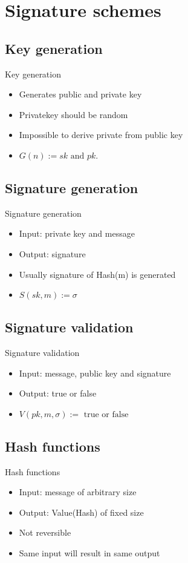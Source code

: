 \documentclass{beamer}
\begin{document}
\section{Signature schemes}
\subsection{Key generation}
\begin{frame}{Key generation}
	\begin{itemize}
	\item Generates public and private key
	\item Privatekey should be random
	\item Impossible to derive private from public key
	\item $G(n) := sk \text{ and } pk.$
	\end{itemize}
\end{frame}
\subsection{Signature generation}
\begin{frame}{Signature generation}
	\begin{itemize}
		\item Input: private key and message
		\item Output: signature
		\item Usually signature of Hash(m) is generated
		\item $S(sk, m) := \sigma$
	\end{itemize}
\end{frame}
\subsection{Signature validation}
\begin{frame}{Signature validation}
	\begin{itemize}
		\item Input: message, public key and signature
		\item Output: true or false
		\item $V(pk, m, \sigma) := \text{ true or false}$
	\end{itemize}
\end{frame}
\subsection{Hash functions}
\begin{frame}{Hash functions}
	\begin{itemize}
		\item Input: message of arbitrary size
		\item Output: Value(Hash) of fixed size
		\item Not reversible
		\item Same input will result in same output
	\end{itemize}
\end{frame}
\end{document}
